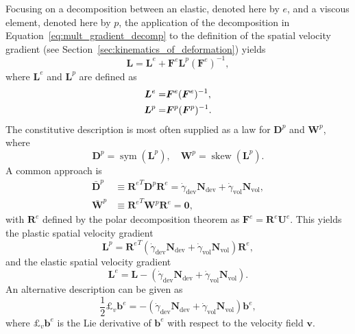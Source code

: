 Focusing on a decomposition between an elastic, denoted here by $e$, and a viscous element, denoted here by $p$, the application of the decomposition in Equation~\eqref{eq:mult_gradient_decomp} to the definition of the spatial velocity gradient (see Section~\ref{sec:kinematics_of_deformation}) yields
\begin{equation}
	\bm L = \bm L^e + \bm F^e \bm L^p (\bm F^e)^{-1},
\end{equation}
where $\bm L^e$ and $\bm L^p$ are defined as
\begin{align}
	\bm L^e =&  \do{\bm F}^e(\bm F^e)^{-1},\\
	\bm L^p =&  \do{\bm F}^p(\bm F^p)^{-1}.
\end{align}
The constitutive description is most often supplied as a law for $\bm D^p$ and $\bm W^p$, where
\begin{equation}
	\bm D^p = \operatorname{sym}(\bm L^p),\quad \bm W^p = \operatorname{skew}(\bm L^p).
\end{equation}
A common approach is \citep{desouzanetoComputationalMethodsPlasticity2008}
\begin{align}
  \label{eq:rate_plasticity_de_souza}
	\bar{\bm D}^p &\equiv  {\bm R^e}^T \bm D^p \bm R^e  = \dot\gamma_\text{dev} \bm N_\text{dev} + \dot\gamma_\text{vol} \bm N_\text{vol},\\
	\bar{\bm W}^p &\equiv {\bm R^e}^T \bm W^p \bm R^e = \bm 0,
\end{align}
with $\bm R^e$ defined by the polar decomposition theorem as $\bm F^e = \bm R^e\bm U^e$.
This yields the plastic spatial velocity gradient
\begin{equation}
	\bm L^p = {\bm R^e}^T(\dot\gamma_\text{dev} \bm N_\text{dev} + \dot\gamma_\text{vol} \bm N_\text{vol})\bm R^e,
\end{equation}
and the elastic spatial velocity gradient
\begin{equation}
	\bm L^e = \bm L - (\dot\gamma_\text{dev} \bm N_\text{dev} + \dot\gamma_\text{vol} \bm N_\text{vol}).
\end{equation}
An alternative description can be given as
\begin{equation}
  \label{eq:flow_rule_lie_derivative}
	\frac{1}{2}£_v \bm b^e = -(\dot\gamma_\text{dev} \bm N_\text{dev} + \dot\gamma_\text{vol} \bm N_\text{vol})\bm b^e,
\end{equation}
where $£_v \bm b^e$ is the Lie derivative of $\bm b^e$ with respect to the velocity field $\bm v$.

